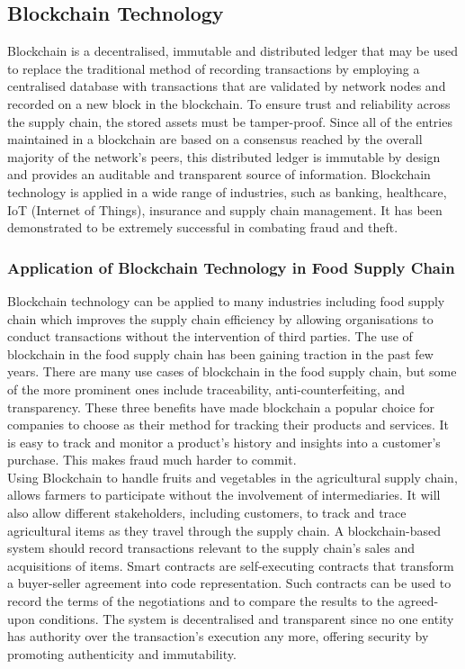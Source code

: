 \documentclass[12pt,a4paper,twocolumn,fleqn]{article}
\begin{document}
\subsection{Blockchain Technology}
Blockchain is a decentralised, immutable and distributed ledger that may be used to replace the traditional method of recording transactions by employing a centralised database with transactions that are validated by network nodes and recorded on a new block in the blockchain. To ensure trust and reliability across the supply chain, the stored assets must be tamper-proof. Since all of the entries maintained in a blockchain are based on a consensus reached by the overall majority of the network's peers, this distributed ledger is immutable by design and provides an auditable and transparent source of information. Blockchain technology is applied in a wide range of industries, such as banking, healthcare, IoT (Internet of Things), insurance and supply chain management. It has been demonstrated to be extremely successful in combating fraud and theft.
\\
\subsubsection{Application of Blockchain Technology in Food Supply Chain}
Blockchain technology can be applied to many industries including food supply chain which improves the supply chain efficiency by allowing organisations to conduct transactions without the intervention of third parties. The use of blockchain in the food supply chain has been gaining traction in the past few years. There are many use cases of blockchain in the food supply chain, but some of the more prominent ones include traceability, anti-counterfeiting, and transparency. These three benefits have made blockchain a popular choice for companies to choose as their method for tracking their products and services. It is easy to track and monitor a product’s history and insights into a customer's purchase. This makes fraud much harder to commit. \\

Using Blockchain to handle fruits and vegetables in the agricultural supply chain, allows farmers to participate without the involvement of intermediaries. It will also allow different stakeholders, including customers, to track and trace agricultural items as they travel through the supply chain. A blockchain-based system should record transactions relevant to the supply chain's sales and acquisitions of items. Smart contracts are self-executing contracts that transform a buyer-seller agreement into code representation. Such contracts can be used to record the terms of the negotiations and to compare the results to the agreed-upon conditions. The system is decentralised and transparent since no one entity has authority over the transaction's execution any more, offering security by promoting authenticity and immutability. \\
\end{document}
